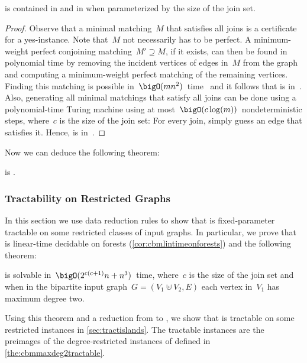 \begin{observation}\label{obs:cbminnpwp}
  \pCBMs{} is contained in \claNP{} and in  when parameterized by the size of the join set.
\end{observation}\begin{proof}
  Observe that a minimal matching~$M$ that satisfies all joins is a certificate for a yes-instance. Note that~$M$ not necessarily has to be perfect. A minimum-weight perfect conjoining matching~$M' \supseteq M$, if it exists, can then be found in polynomial time by removing the incident vertices of edges in~$M$ from the graph and computing a minimum-weight perfect matching of the remaining vertices. Finding this matching is possible in~$\bigO(mn^2)$~time~\cite{EK72} and it follows that \pCBMs{} is in~\claNP. Also, generating all minimal matchings that satisfy all joins can be done using a polynomial-time Turing machine using at most~$\bigO(c\log(m))$~nondeterministic steps, where~$c$ is the size of the join set: For every join, simply guess an edge that satisfies it. Hence, \pCBMs{} is in~.
\end{proof}
Now we can deduce the following theorem:
\begin{theorem}\label{the:cbmnph}
  \pCBM{} is \NPc .
\end{theorem}

\subsubsection{Tractability on Restricted Graphs}

In this section we use data reduction rules to show that \pCBMs{} is fixed-parameter tractable on some restricted classes of input graphs. In particular, we prove that \pCBMs{} is linear-time decidable on forests (\autoref{cor:cbmlintimeonforests}) and the following theorem:
\begin{theorem}\label{the:cbmmaxdeg2tractable}
  \pCBM{} is solvable in~$\bigO(2^{c(c+1)}n + n^3)$~time, where~$c$ is the size of the join set and when in the bipartite input graph~$G = (V_1 \uplus V_2, E)$ each vertex in~$V_1$ has maximum degree two.
\end{theorem}
Using this theorem and a reduction from \pWMEE{} to \pCBMs{}, we show that \pWMEE{} is tractable on some restricted instances in \autoref{sec:tractislands}. The tractable instances are the preimages of the degree-restricted instances of \pCBMs{} defined in \autoref{the:cbmmaxdeg2tractable}.

